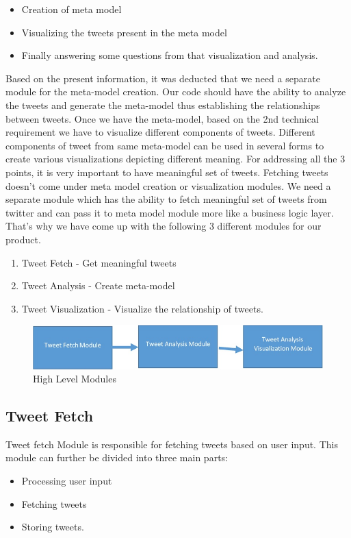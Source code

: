 \documentclass[11pt]{article}
\begin{document}
\begin{itemize}
\item Creation of meta model
\item Visualizing the tweets present in the meta model
\item Finally answering some questions from that visualization and analysis.
\end{itemize}


Based on the present information, it was deducted that we need a separate module for the meta-model creation. Our code should have the ability to analyze the tweets and generate the meta-model thus establishing the relationships between tweets. Once we have the meta-model, based on the 2nd technical requirement we have to visualize different components of tweets. Different components of tweet from same meta-model can be used in several forms to create various visualizations depicting different meaning. For addressing all the 3 points, it is very important to have meaningful set of tweets. Fetching tweets doesn't come under meta model creation or visualization modules. We need a separate module which has the ability to fetch meaningful set of tweets from twitter and can pass it to meta model module more like a business logic layer. That's why we have come up with the following 3 different modules for our product.
\begin{enumerate}
\item Tweet Fetch - Get meaningful tweets
\item Tweet Analysis - Create meta-model
\item Tweet Visualization - Visualize the relationship of tweets.
\end{enumerate}

\begin{figure}[h]
\centering
\includegraphics[width=\textwidth]{HighLevelDesign.jpg}
\caption{High Level Modules}
\end{figure}

\subsection{Tweet Fetch}
Tweet fetch Module is responsible for fetching tweets based on user input. This module can further be divided into three main parts: 
\begin{itemize}
\item Processing user input
\item Fetching tweets
\item Storing tweets.
\end{itemize}
\end{document}
